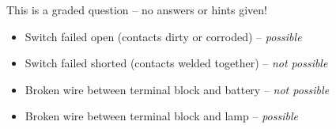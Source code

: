 \vfil 

\eject






This is a graded question -- no answers or hints given!







\begin{itemize}
\item{} Switch failed open (contacts dirty or corroded) -- {\it possible} 
\item{} Switch failed shorted (contacts welded together) -- {\it not possible}
\item{} Broken wire between terminal block and battery -- {\it not possible}
\item{} Broken wire between terminal block and lamp -- {\it possible}
\end{itemize}




